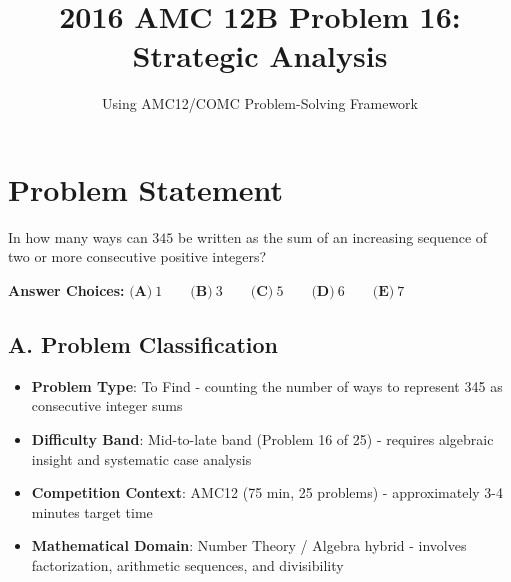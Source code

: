 \documentclass[11pt]{article}
\title{\textbf{2016 AMC 12B Problem 16: Strategic Analysis}}
\author{Using AMC12/COMC Problem-Solving Framework}
\date{}
\begin{document}
\maketitle

\section*{Problem Statement}
In how many ways can $345$ be written as the sum of an increasing sequence of two or more consecutive positive integers?

\textbf{Answer Choices:} 
$\textbf{(A)}\ 1\qquad\textbf{(B)}\ 3\qquad\textbf{(C)}\ 5\qquad\textbf{(D)}\ 6\qquad\textbf{(E)}\ 7$

\begin{problemconfigbox}
\subsection*{A. Problem Classification}
\begin{itemize}[leftmargin=*]
    \item \textbf{Problem Type}: To Find - counting the number of ways to represent 345 as consecutive integer sums
    \item \textbf{Difficulty Band}: Mid-to-late band (Problem 16 of 25) - requires algebraic insight and systematic case analysis
    \item \textbf{Competition Context}: AMC12 (75 min, 25 problems) - approximately 3-4 minutes target time
    \item \textbf{Mathematical Domain}: Number Theory / Algebra hybrid - involves factorization, arithmetic sequences, and divisibility
\end{itemize}


\end{problemconfigbox}
\end{document}
